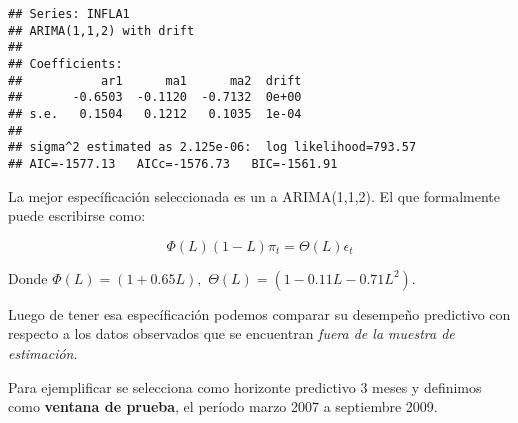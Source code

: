 \documentclass[
]{book}
\begin{document}
\begin{verbatim}
## Series: INFLA1 
## ARIMA(1,1,2) with drift 
## 
## Coefficients:
##           ar1      ma1      ma2  drift
##       -0.6503  -0.1120  -0.7132  0e+00
## s.e.   0.1504   0.1212   0.1035  1e-04
## 
## sigma^2 estimated as 2.125e-06:  log likelihood=793.57
## AIC=-1577.13   AICc=-1576.73   BIC=-1561.91
\end{verbatim}

La mejor específicación seleccionada es un a ARIMA(1,1,2). El que formalmente puede escribirse como:

\begin{equation} 
\Phi(L)(1-L)\pi_{t}=\Theta(L)\epsilon_{t}
\label{eq:3}
\end{equation}

Donde \(\Phi(L)=(1+0.65L),\) \(\Theta(L)=(1-0.11L-0.71L^{2})\).

Luego de tener esa específicación podemos comparar su desempeño predictivo con respecto a los datos observados que se encuentran \emph{fuera de la muestra de estimación}.

Para ejemplificar se selecciona como horizonte predictivo 3 meses y definimos como \textbf{ventana de prueba}, el período marzo 2007 a septiembre 2009.
\end{document}

